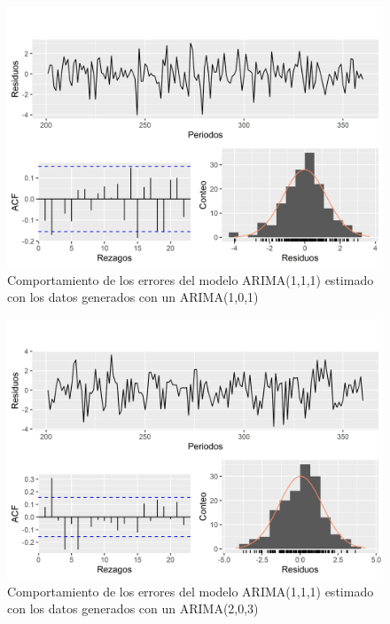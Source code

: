 \documentclass[
]{article}
\begin{document}
\begin{figure}[H]
\includegraphics[width=1\linewidth,height=1\textheight]{Tesis_files/figure-latex/errores_simulados_arima_estandar2-1} \caption{Comportamiento de los errores del modelo ARIMA(1,1,1) estimado con los datos generados con un ARIMA(1,0,1)}\label{fig:errores_simulados_arima_estandar2}
\end{figure}

\begin{figure}[H]
\includegraphics[width=1\linewidth,height=1\textheight]{Tesis_files/figure-latex/errores_simulados_arima_estandar3-1} \caption{Comportamiento de los errores del modelo ARIMA(1,1,1) estimado con los datos generados con un ARIMA(2,0,3)}\label{fig:errores_simulados_arima_estandar3}
\end{figure}
\end{document}
